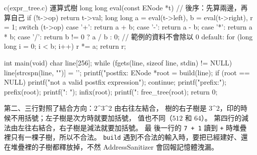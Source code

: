 \begin{example}[label=ex:bt-expr]{c}{(expr\_tree.c) 運算式樹}
long long eval(const ENode *t)      // 後序：先算兩邊，再算自己
{
    if (!t->op) {
        return t->val;
    }
    long long a = eval(t->left), b = eval(t->right), r = 1;
    switch (t->op) {
    case '+': return a + b;
    case '-': return a - b;
    case '*': return a * b;
    case '/': return b != 0 ? a / b : 0;    // 範例的資料不會除以 0
    default:
        for (long long i = 0; i < b; i++) {
            r *= a;
        }
        return r;
    }
}

int main(void)
{
    char line[256];
    while (fgets(line, sizeof line, stdin) != NULL) {
        line[strcspn(line, "\n")] = '\0';
        printf("postfix: %
        ENode *root = build(line);
        if (root == NULL) {
            printf("not a valid postfix expression\n");
            continue;
        }
        printf("prefix:");
        prefix(root);
        printf("\ninfix: ");
        infix(root);
        printf("\nvalue: %
        free_tree(root);
    }
    return 0;
}
\end{example}
\endgroup

第二、三行對照了結合方向：$2 \text{\textasciicircum} 3 \text{\textasciicircum} 2$ 由右往左結合，
樹的右子樹是 $3 \text{\textasciicircum} 2$，印的時候不用括號；左子樹是次方時就要加括號，
值也不同（$512$ 和 $64$）。 第四行的減法由左往右結合，右子樹是減法就要加括號。 最
後一行的 \texttt{7 + 1} 讀到 \texttt{+} 時堆疊裡只有一棵子樹，所以不合法。
\texttt{build} 遇到不合法的輸入時，要把已經建好、還在堆疊裡的子樹都釋放掉，不然
AddressSanitizer 會回報記憶體洩漏。

